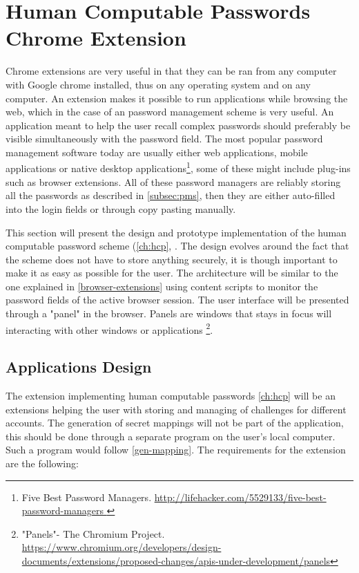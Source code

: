 \section{Human Computable Passwords Chrome Extension}
Chrome extensions are very useful in that they can be ran from any computer with Google chrome installed, thus on any operating system and on any computer. An extension makes it possible to run applications while browsing the web, which in the case of an password management scheme is very useful. An application meant to help the user recall complex passwords should preferably be visible simultaneously with the password field. The most popular password management software today are usually either web applications, mobile applications or native desktop applications\footnote{Five Best Password Managers. \url{ http://lifehacker.com/5529133/five-best-password-managers }}, some of these might include plug-ins such as browser extensions. All of these password managers are reliably storing all the passwords as described in \autoref{subsec:pms}, then they are either auto-filled into the login fields or through copy pasting manually. 
\par This section will present the design and prototype implementation of the human computable password scheme (\autoref{ch:hcp}, \cite{hcp-blocki}. The design evolves around the fact that the scheme does not have to store anything securely, it is though important to make it as easy as possible for the user. The architecture will be similar to the one explained in \autoref{browser-extensions} using content scripts to monitor the password fields of the active browser session. The user interface will be presented through a "panel" in the browser. Panels are windows that stays in focus will interacting with other windows or applications \footnote{"Panels"- The Chromium Project. \url{https://www.chromium.org/developers/design-documents/extensions/proposed-changes/apis-under-development/panels}}.




\subsection{Applications Design}
The extension implementing human computable passwords \ref{ch:hcp} will be an extensions helping the user with storing and managing of challenges for different accounts. The generation of secret mappings will not be part of the application, this should be done through a separate program on the user's local computer. Such a program would follow \autoref{gen-mapping}. The requirements for the extension are the following:

